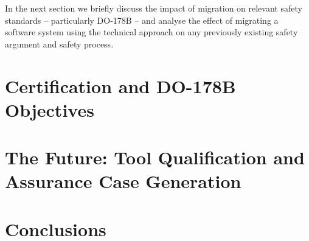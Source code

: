 \documentclass{llncs}
\begin{document}
In the next section we briefly discuss the impact of migration on relevant safety standards -- particularly DO-178B -- and analyse the effect of migrating
a software system using the technical approach on any previously existing safety argument and safety process.

\section{Certification and DO-178B Objectives}

\section{The Future: Tool Qualification and Assurance Case Generation}

\section{Conclusions}



\renewcommand{\baselinestretch}{1.0}
\end{document}
